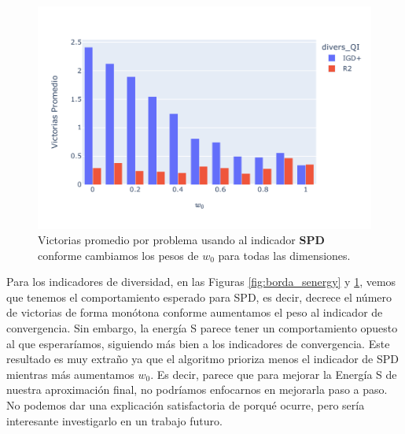 \begin{figure} [H]
    \centering
    \includegraphics[width=\textwidth]{Figuras/borda_obj_ind_spd.pdf}
\caption[Conteo de borda IGD+]{Victorias promedio por problema usando al indicador \textbf{SPD} conforme cambiamos los pesos de $w_0$ para todas las dimensiones.}
\label{fig:borda_spd}
\end{figure}



Para los indicadores de diversidad, en las Figuras \ref{fig:borda_senergy} y \ref{fig:borda_spd}, vemos que tenemos el comportamiento esperado para SPD, es decir, decrece el número de victorias de forma monótona conforme aumentamos el peso al indicador de convergencia. Sin embargo, la energía S parece tener un comportamiento opuesto al que esperaríamos, siguiendo más bien a los indicadores de convergencia. Este resultado es muy extraño ya que el algoritmo prioriza menos el indicador de SPD mientras más aumentamos $w_0$. Es decir, parece que para mejorar la Energía S de nuestra aproximación final, no podríamos enfocarnos en mejorarla paso a paso. No podemos dar una explicación satisfactoria de porqué ocurre, pero sería interesante investigarlo en un trabajo futuro.





